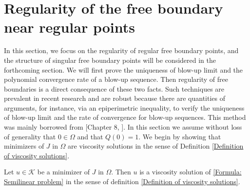 \documentclass[11pt,reqno]{amsart}
\begin{document}
\section{Regularity of the free boundary near regular points}
In this section, we focus on the regularity of regular free boundary points, and the structure of singular free boundary points will be considered in the forthcoming section. We will first prove the uniqueness of blow-up limit and the polynomial convergence rate of a blow-up sequence. Then regularity of free boundaries is a direct consequence of these two facts. Such techniques are prevalent in recent research and are robust because there are quantities of arguments, for instance, via an epiperimetric inequality, to verify the uniqueness of blow-up limit and the rate of convergence for blow-up sequences. This method was mainly borrowed from [Chapter 8, \cite{V2019}]. In this section we assume without loss of generality that $0\in\Omega$ and that  $Q(0)=1$. We begin by showing that minimizers of $J$ in $\Omega$ are viscosity solutions in the sense of Definition \ref{Definition of viscosity solutions}.
\begin{proposition}\label{Proposition: Minimizers are viscosity solutions}
	Let $u\in\mathcal{K}$ be a minimizer of $J$ in $\Omega$. Then $u$ is a viscosity solution of \eqref{Formula: Semilinear problem} in the sense of definition \ref{Definition of viscosity solutions}.
\end{proposition}
\end{document}
